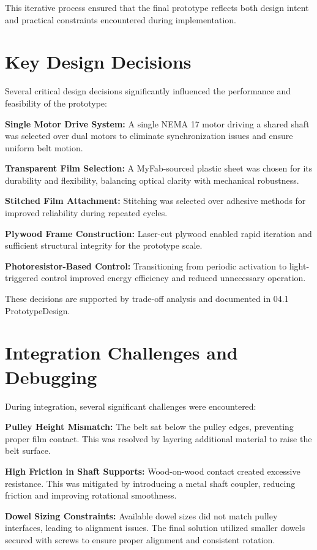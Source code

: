 \documentclass[12pt]{article}
\begin{document}
This iterative process ensured that the final prototype reflects both design intent and practical constraints encountered during implementation.

\section{Key Design Decisions}

Several critical design decisions significantly influenced the performance and feasibility of the prototype:

\textbf{Single Motor Drive System:} A single NEMA 17 motor driving a shared shaft was selected over dual motors to eliminate synchronization issues and ensure uniform belt motion.

\textbf{Transparent Film Selection:} A MyFab-sourced plastic sheet was chosen for its durability and flexibility, balancing optical clarity with mechanical robustness.

\textbf{Stitched Film Attachment:} Stitching was selected over adhesive methods for improved reliability during repeated cycles.

\textbf{Plywood Frame Construction:} Laser-cut plywood enabled rapid iteration and sufficient structural integrity for the prototype scale.

\textbf{Photoresistor-Based Control:} Transitioning from periodic activation to light-triggered control improved energy efficiency and reduced unnecessary operation.

These decisions are supported by trade-off analysis and documented in 04.1 PrototypeDesign.

\section{Integration Challenges and Debugging}

During integration, several significant challenges were encountered:

\textbf{Pulley Height Mismatch:} The belt sat below the pulley edges, preventing proper film contact. This was resolved by layering additional material to raise the belt surface.

\textbf{High Friction in Shaft Supports:} Wood-on-wood contact created excessive resistance. This was mitigated by introducing a metal shaft coupler, reducing friction and improving rotational smoothness.

\textbf{Dowel Sizing Constraints:} Available dowel sizes did not match pulley interfaces, leading to alignment issues. The final solution utilized smaller dowels secured with screws to ensure proper alignment and consistent rotation.
\end{document}
